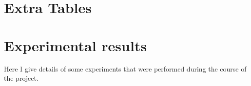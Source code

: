 \documentclass[twocolumn,11pt]{report}
\begin{document}






\appendix


\chapter{Extra Tables}\label{app:Extra_Tables}

\label{Chart}


\chapter{Experimental results}\label{app:Experimental_results}

Here I give details of some experiments that were performed during the
course of the project.  


\label{Easy}


\label{Hard}
\end{document}

